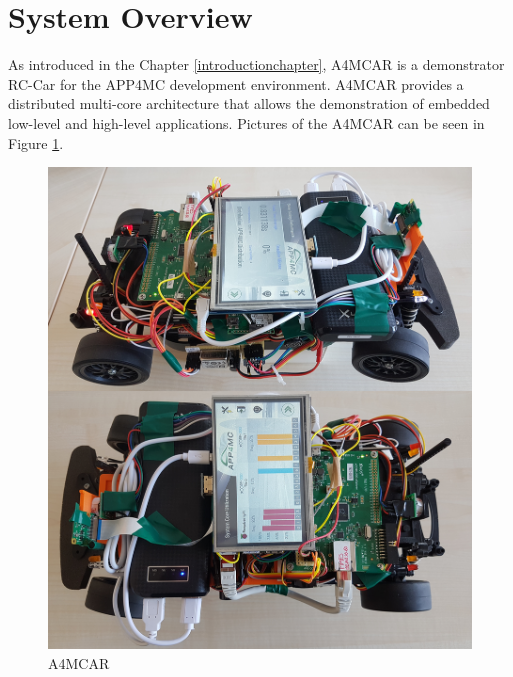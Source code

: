 \section{System Overview}
As introduced in the Chapter \ref{introductionchapter}, A4MCAR is a demonstrator RC-Car for the APP4MC development environment. A4MCAR provides a distributed multi-core architecture that allows the demonstration of embedded low-level and high-level applications. Pictures of the A4MCAR can be seen in Figure \ref{fig:a4mcar}.
\begin{figure}[!ht]
	\centering
	\captionsetup{justification=centering}
	\includegraphics[scale=0.4]{content/images/a4mcar.png}
	\caption{A4MCAR}
	\label{fig:a4mcar}
\end{figure}
